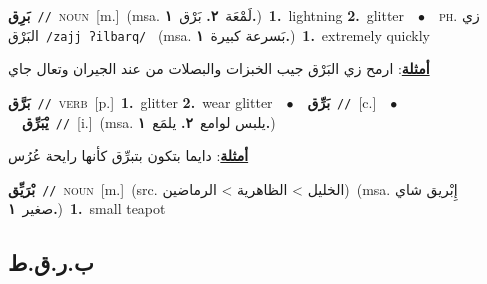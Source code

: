 \documentclass[10pt,a4paper,twoside]{article} %
\begin{document}
\begin{multicols}{2}
{\setlength\topsep{0pt}\textbf{\foreignlanguage{arabic}{بَرِق}}\ {\color{gray}\texttt{//}\color{black}}\ \textsc{noun}\ [m.]\ \color{gray}(msa. \foreignlanguage{arabic}{لَمْعَة}~\foreignlanguage{arabic}{\textbf{٢.}}  \foreignlanguage{arabic}{بَرْق}~\foreignlanguage{arabic}{\textbf{١.}})\color{black}\ \textbf{1.}~lightning  \textbf{2.}~glitter\ \ $\bullet$\ \ \textsc{ph.} \color{gray} \foreignlanguage{arabic}{زي البَرْق}\color{black}\ {\color{gray}\texttt{/{\sffamily zajj ʔilbarq}/}\color{black}}\ \color{gray} (msa. \foreignlanguage{arabic}{بَسرعة كبيرة}~\foreignlanguage{arabic}{\textbf{١.}})\color{black}\ \textbf{1.}~extremely quickly\  \begin{flushright}\color{gray}\foreignlanguage{arabic}{\textbf{\underline{\foreignlanguage{arabic}{أمثلة}}}: ارمح زي البَرْق جيب الخبزات والبصلات من عند الجيران وتعال جاي}\end{flushright}\color{black}} \vspace{2mm}

{\setlength\topsep{0pt}\textbf{\foreignlanguage{arabic}{بَرَّق}}\ {\color{gray}\texttt{//}\color{black}}\ \textsc{verb}\ [p.]\ \textbf{1.}~glitter  \textbf{2.}~wear glitter\ \ $\bullet$\ \ \setlength\topsep{0pt}\textbf{\foreignlanguage{arabic}{بَرِّق}}\ {\color{gray}\texttt{//}\color{black}}\ [c.]\ \ $\bullet$\ \ \setlength\topsep{0pt}\textbf{\foreignlanguage{arabic}{يْبَرِّق}}\ {\color{gray}\texttt{//}\color{black}}\ [i.]\ \color{gray}(msa. \foreignlanguage{arabic}{يلبس لوامع}~\foreignlanguage{arabic}{\textbf{٢.}}  \foreignlanguage{arabic}{يلمَع}~\foreignlanguage{arabic}{\textbf{١.}})\color{black}\  \begin{flushright}\color{gray}\foreignlanguage{arabic}{\textbf{\underline{\foreignlanguage{arabic}{أمثلة}}}: دايما بتكون بتبرِّق كأنها رايحة عُرُس}\end{flushright}\color{black}} \vspace{2mm}

{\setlength\topsep{0pt}\textbf{\foreignlanguage{arabic}{بْرَيِّق}}\ {\color{gray}\texttt{//}\color{black}}\ \textsc{noun}\ [m.]\ (src. \color{gray}\foreignlanguage{arabic}{الخليل > الظاهرية > الرماضين}\color{black})\ \color{gray}(msa. \foreignlanguage{arabic}{إِبْريق شاي صغير}~\foreignlanguage{arabic}{\textbf{١.}})\color{black}\ \textbf{1.}~small teapot\ } \vspace{2mm}

\vspace{-3mm}
\subsection*{\color{blue}\foreignlanguage{arabic}{ب.ر.ق.ط}\color{blue}{}} 


\end{multicols}
\end{document}
